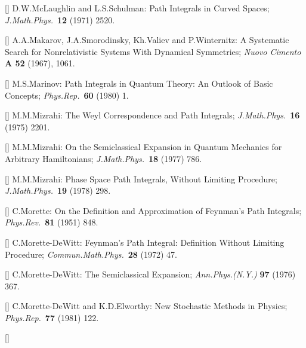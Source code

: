 \item{[\MCLS]}
D.W.McLaughlin and L.S.Schulman:
Path Integrals in Curved Spaces;
{\it J.Math.Phys.}\ {\bf 12} (1971) 2520.
\item{[\MSVW]}
A.A.Makarov, J.A.Smorodinsky, Kh.Valiev and P.Winternitz:
A Systematic Search for Nonrelativistic Systems With Dynamical
Symmetries;
{\it Nuovo Cimento} {\bf A 52} (1967), 1061.
\item{[\MARa]}
M.S.Marinov:
Path Integrals in Quantum Theory: An Outlook of Basic Concepts;
{\it Phys.Rep.}\ {\bf 60} (1980) 1.
\item{[\MIZa]}
M.M.Mizrahi:
The Weyl Correspondence and Path Integrals;
{\it J.Math.Phys.}\ {\bf 16} (1975) 2201.
\item{[\MIZc]}
M.M.Mizrahi:
On the Semiclassical Expansion in Quantum Mechanics for Arbitrary
Hamiltonians;
{\it J.Math.Phys.}\ {\bf 18} (1977) 786.
\item{[\MIZd]}
M.M.Mizrahi:
Phase Space Path Integrals, Without Limiting Procedure;
{\it J.Math.Phys.}\ {\bf 19} (1978) 298.
\item{[\MORE]}
C.Morette:
On the Definition and Approximation of Feynman's Path Integrals;
{\it Phys.Rev.}\ {\bf 81} (1951) 848.
\item{[\MDEW]}
C.Morette-DeWitt:
Feynman's Path Integral: Definition Without Limiting Procedure;
{\it Commun.Math.Phys.}\ {\bf 28} (1972) 47.
\item{[\DEWMc]}
C.Morette-DeWitt:
The Semiclassical Expansion;
{\it Ann.Phys.(N.Y.)} {\bf 97} (1976) 367.
\item{[\DEWMEL]}
C.Morette-DeWitt and K.D.Elworthy:
New Stochastic Methods in Physics;
{\it Phys.Rep.}\ {\bf 77} (1981) 122.
\item{[\NELb]}
